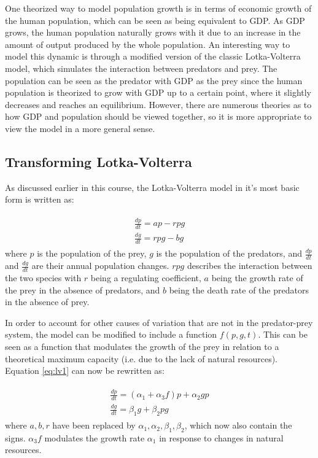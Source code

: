 \documentclass[a4paper]{article}
\begin{document}
One theorized way to model population growth is in terms of economic growth of the human population, which can be seen as being equivalent to GDP. As GDP grows, the human population naturally grows with it due to an increase in the amount of output produced by the whole population. An interesting way to model this dynamic is through a modified version of the classic Lotka-Volterra model, which simulates the interaction between predators and prey. The population can be seen as the predator with GDP as the prey since the human population is theorized to grow with GDP up to a certain point, where it slightly decreases and reaches an equilibrium. However, there are numerous theories as to how GDP and population should be viewed together, so it is more appropriate to view the model in a more general sense. 

\subsection{Transforming Lotka-Volterra}

As discussed earlier in this course, the Lotka-Volterra model in it's most basic form is written as:

\begin{align}
\begin{split}
\label{eq:lv1}
	\frac{dp}{dt} = ap - rpg \\
	\frac{dg}{dt} = rpg - bg
\end{split}
\end{align}
where $p$ is the population of the prey, $g$ is the population of the predators, and $\frac{dp}{dt}$ and $\frac{dg}{dt}$ are their annual population changes. $rpg$ describes the interaction between the two species with $r$ being a regulating coefficient, $a$ being the growth rate of the prey in the absence of predators, and $b$ being the death rate of the predators in the absence of prey. 

In order to account for other causes of variation that are not in the predator-prey system, the model can be modified to include a function $f(p, g, t)$. This can be seen as a function that modulates the growth of the prey in relation to a theoretical maximum capacity (i.e. due to the lack of natural resources). Equation \ref{eq:lv1} can now be rewritten as:

\begin{align}
\begin{split}
\label{eq:lv3}
	\frac{dp}{dt} = (\alpha_1 + \alpha_3 f)p + \alpha_2 g p \\
	\frac{dg}{dt} = \beta_1 g + \beta_2 p g
\end{split}
\end{align}
where $a, b, r$ have been replaced by $\alpha_1, \alpha_2, \beta_1, \beta_2$, which now also contain the signs. $\alpha_3f$ modulates the growth rate $\alpha_1$ in response to changes in natural resources.
\end{document}
